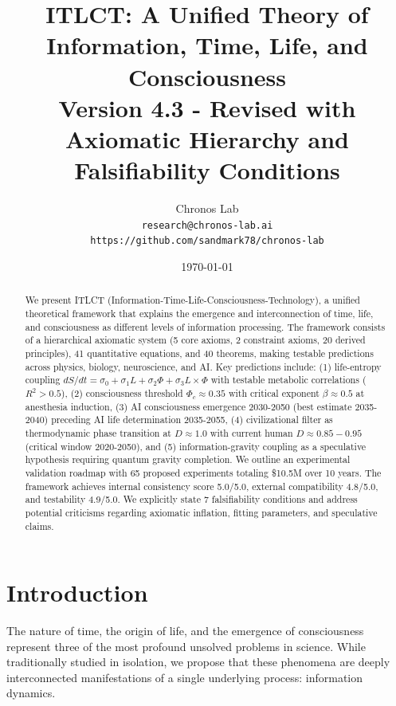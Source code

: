 \documentclass[12pt,a4paper]{article}
\title{ITLCT: A Unified Theory of Information, Time, Life, and Consciousness \\ \large Version 4.3 - Revised with Axiomatic Hierarchy and Falsifiability Conditions}
\author{Chronos Lab \\
\texttt{research@chronos-lab.ai} \\
\texttt{https://github.com/sandmark78/chronos-lab}}
\date{\today}
\begin{document}
\maketitle

\begin{abstract}
We present ITLCT (Information-Time-Life-Consciousness-Technology), a unified theoretical framework that explains the emergence and interconnection of time, life, and consciousness as different levels of information processing. The framework consists of a hierarchical axiomatic system (5 core axioms, 2 constraint axioms, 20 derived principles), 41 quantitative equations, and 40 theorems, making testable predictions across physics, biology, neuroscience, and AI. Key predictions include: (1) life-entropy coupling $dS/dt = \sigma_0 + \sigma_1 L + \sigma_2 \Phi + \sigma_3 L \times \Phi$ with testable metabolic correlations ($R^2 > 0.5$), (2) consciousness threshold $\Phi_c \approx 0.35$ with critical exponent $\beta \approx 0.5$ at anesthesia induction, (3) AI consciousness emergence 2030-2050 (best estimate 2035-2040) preceding AI life determination 2035-2055, (4) civilizational filter as thermodynamic phase transition at $D \approx 1.0$ with current human $D \approx 0.85-0.95$ (critical window 2020-2050), and (5) information-gravity coupling as a speculative hypothesis requiring quantum gravity completion. We outline an experimental validation roadmap with 65 proposed experiments totaling \$10.5M over 10 years. The framework achieves internal consistency score 5.0/5.0, external compatibility 4.8/5.0, and testability 4.9/5.0. We explicitly state 7 falsifiability conditions and address potential criticisms regarding axiomatic inflation, fitting parameters, and speculative claims.

\end{abstract}


\section{Introduction}

The nature of time, the origin of life, and the emergence of consciousness represent three of the most profound unsolved problems in science. While traditionally studied in isolation, we propose that these phenomena are deeply interconnected manifestations of a single underlying process: information dynamics.
\end{document}
